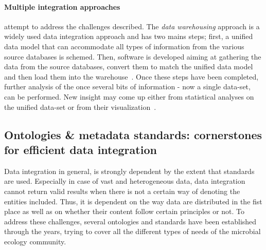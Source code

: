       \paragraph{Multiple integration approaches} attempt to address the challenges described. 
      The \textit{data warehousing} approach is a widely used data integration approach and has two mains steps; 
      first, a unified data model that can accommodate all types of  
      information from the various source databases is schemed.
      Then, software is developed aiming at  
      gathering the data from the source databases, 
      convert them to match the unified data model and 
      then load them into the warehouse~\cite{stein2003integrating}.
      Once these steps have been completed, further analysis of the once
      several bits of information - now a single data-set, can be performed.
      New insight may come up either from statistical analyses on the unified
      data-set or from their visualization~\cite{leonelli2013integrating}.  

   \subsection{Ontologies \& metadata standards: cornerstones for efficient data integration}
   \label{subsec:metadata_intro}
      Data integration in general, 
      is strongly dependent by the extent that standards are used. 
      Especially in case of vast and heterogeneous data, 
      data integration cannot return valid results 
      when there is not a certain way
      of denoting the entities included.
      Thus, it is dependent on the way data are distributed in the fist place 
      as well as on whether their content follow certain principles or not. 
      To address these challenges, several ontologies and standards have 
      been established through the years, trying to cover all the different 
      types of needs of the microbial ecology community. 

